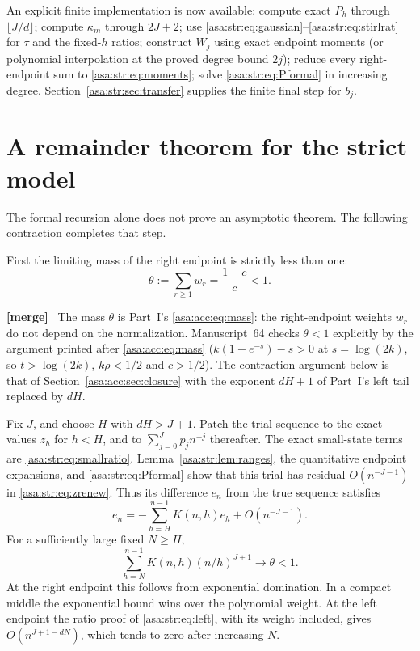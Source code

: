 \documentclass[11pt,letterpaper]{article}
\theoremstyle{remark}\newtheorem{remark}[theorem]{Remark}
\numberwithin{equation}{section}
\newenvironment{mergenote}{\par\smallskip\begingroup\small
 \noindent\textbf{[merge]}\ }{\par\endgroup\smallskip}
\begin{document}
An explicit finite implementation is now available: compute exact $P_h$ through $\lfloor J/d\rfloor$; compute $\kappa_m$ through $2J+2$; use \eqref{asa:str:eq:gaussian}--\eqref{asa:str:eq:stirlrat} for $\tau$ and the fixed-$h$ ratios; construct $W_j$ using exact endpoint moments (or polynomial interpolation at the proved degree bound $2j$); reduce every right-endpoint sum to \eqref{asa:str:eq:moments}; solve \eqref{asa:str:eq:Pformal} in increasing degree. Section~\ref{asa:str:sec:transfer} supplies the finite final step for $b_j$.

\section{A remainder theorem for the strict model}\label{asa:str:sec:remainder}
The formal recursion alone does not prove an asymptotic theorem. The following contraction completes that step.

First the limiting mass of the right endpoint is strictly less than one:
\begin{equation}\label{asa:str:eq:theta}
 \theta:=\sum_{r\ge1}w_r=\frac{1-c}{c}<1.
\end{equation}
\begin{mergenote}
The mass $\theta$ is Part~I's \eqref{asa:acc:eq:mass}: the right-endpoint
weights $w_r$ do not depend on the normalization. Manuscript~64 checks
$\theta<1$ explicitly by the argument printed after \eqref{asa:acc:eq:mass}
($k(1-e^{-s})-s>0$ at $s=\log(2k)$, so $t>\log(2k)$, $k\rho<1/2$ and
$c>1/2$). The contraction argument below is that of
Section~\ref{asa:acc:sec:closure} with the exponent $dH+1$ of Part~I's left
tail replaced by $dH$.
\end{mergenote}

Fix $J$, and choose $H$ with $dH>J+1$. Patch the trial sequence to the exact values $z_h$ for $h<H$, and to $\sum_{j=0}^Jp_jn^{-j}$ thereafter. The exact small-state terms are \eqref{asa:str:eq:smallratio}. Lemma~\ref{asa:str:lem:ranges}, the quantitative endpoint expansions, and \eqref{asa:str:eq:Pformal} show that this trial has residual $O(n^{-J-1})$ in \eqref{asa:str:eq:zrenew}. Thus its difference $e_n$ from the true sequence satisfies
\begin{equation}\label{asa:str:eq:error}
 e_n=-\sum_{h=H}^{n-1}K(n,h)e_h+O(n^{-J-1}).
\end{equation}
For a sufficiently large fixed $N\ge H$,
\begin{equation}\label{asa:str:eq:weighted}
 \sum_{h=N}^{n-1}K(n,h)(n/h)^{J+1}\longrightarrow\theta<1.
\end{equation}
At the right endpoint this follows from exponential domination. In a compact middle the exponential bound wins over the polynomial weight. At the left endpoint the ratio proof of \eqref{asa:str:eq:left}, with its weight included, gives $O(n^{J+1-dN})$, which tends to zero after increasing $N$.
\end{document}
